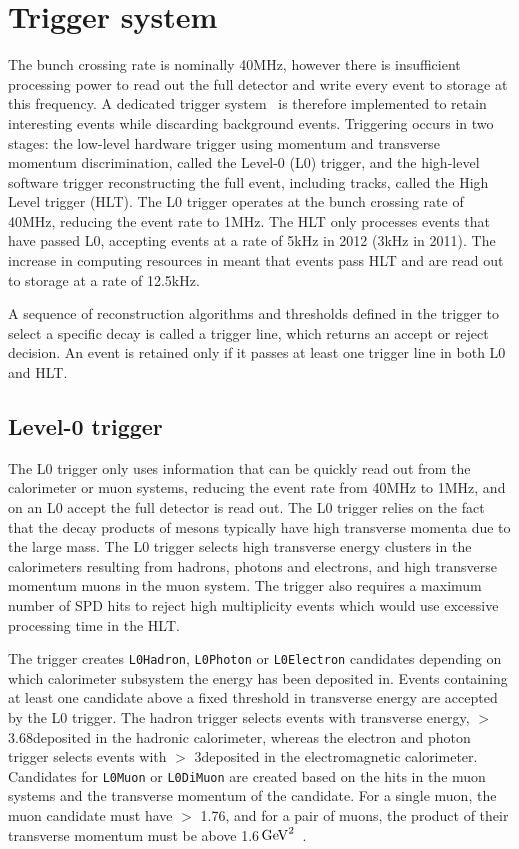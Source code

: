 \section{Trigger system}
\label{sec:detector:trigger}

The \lhc bunch crossing rate is nominally 40MHz, however there is insufficient processing power to read out the full detector and write every event to storage at this frequency. A dedicated trigger system~\cite{LHCb-DP-2012-004} is therefore implemented to retain interesting events while discarding background events. Triggering occurs in two stages: the low-level hardware trigger using momentum and transverse momentum discrimination, called the Level-0 (L0) trigger, and the high-level software trigger reconstructing the full event, including tracks, called the High Level trigger (HLT). The L0 trigger operates at the bunch crossing rate of 40MHz, reducing the event rate to 1MHz. The HLT only processes events that have passed L0, accepting events at a rate of 5kHz in 2012 (3kHz in 2011). The increase in computing resources in \runtwo meant that events pass HLT and are read out to storage at a rate of 12.5kHz.

A sequence of reconstruction algorithms and thresholds defined in the trigger to select a specific decay is called a trigger line, which returns an accept or reject decision. An event is retained only if it passes at least one trigger line in both L0 and HLT.

\subsection{Level-0 trigger}

The L0 trigger only uses information that can be quickly read out from the calorimeter or muon systems, reducing the event rate from 40MHz to 1MHz, and on an L0 accept the full detector is read out. The L0 trigger relies on the fact that the decay products of \B mesons typically have high transverse momenta due to the large \B mass. The L0 trigger selects high transverse energy clusters in the calorimeters resulting from hadrons, photons and electrons, and high transverse momentum muons in the muon system. The trigger also requires a maximum number of SPD hits to reject high multiplicity events which would use excessive processing time in the HLT. 

The trigger creates {\tt L0Hadron}, {\tt L0Photon} or {\tt L0Electron} candidates depending on which calorimeter subsystem the energy has been deposited in. Events containing at least one candidate above a fixed threshold in transverse energy are accepted by the L0 trigger. The hadron trigger selects events with transverse energy, \et $>$ 3.68\gev deposited in the hadronic calorimeter, whereas the electron and photon trigger selects events with \et $>$ 3\gev deposited in the electromagnetic calorimeter. Candidates for {\tt L0Muon} or {\tt L0DiMuon} are created based on the hits in the muon systems and the transverse momentum of the candidate. For a single muon, the muon candidate must have \pt $>$ 1.76\gev, and for a pair of muons, the product of their transverse momentum must be above 1.6$\mathrm{\,Ge\kern -0.1em V}^2$~\cite{trigger_tim}.

